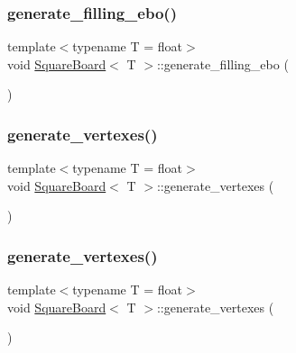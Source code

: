 \subsubsection{\texorpdfstring{generate\+\_\+filling\+\_\+ebo()}{generate\_filling\_ebo()}\hspace{0.1cm}{\footnotesize\ttfamily [2/2]}}
{\footnotesize\ttfamily template$<$typename T  = float$>$ \\
void \mbox{\hyperlink{classSquareBoard}{Square\+Board}}$<$ T $>$\+::generate\+\_\+filling\+\_\+ebo (\begin{DoxyParamCaption}{ }\end{DoxyParamCaption})\hspace{0.3cm}{\ttfamily [private]}}

\mbox{\label{classSquareBoard_a401c48fa5977d166b75e94bb7ddf1db7}} 
\subsubsection{\texorpdfstring{generate\+\_\+vertexes()}{generate\_vertexes()}\hspace{0.1cm}{\footnotesize\ttfamily [1/4]}}
{\footnotesize\ttfamily template$<$typename T  = float$>$ \\
void \mbox{\hyperlink{classSquareBoard}{Square\+Board}}$<$ T $>$\+::generate\+\_\+vertexes (\begin{DoxyParamCaption}{ }\end{DoxyParamCaption})\hspace{0.3cm}{\ttfamily [private]}}

\mbox{\label{classSquareBoard_a401c48fa5977d166b75e94bb7ddf1db7}} 
\subsubsection{\texorpdfstring{generate\+\_\+vertexes()}{generate\_vertexes()}\hspace{0.1cm}{\footnotesize\ttfamily [2/4]}}
{\footnotesize\ttfamily template$<$typename T  = float$>$ \\
void \mbox{\hyperlink{classSquareBoard}{Square\+Board}}$<$ T $>$\+::generate\+\_\+vertexes (\begin{DoxyParamCaption}{ }\end{DoxyParamCaption})\hspace{0.3cm}{\ttfamily [private]}}

